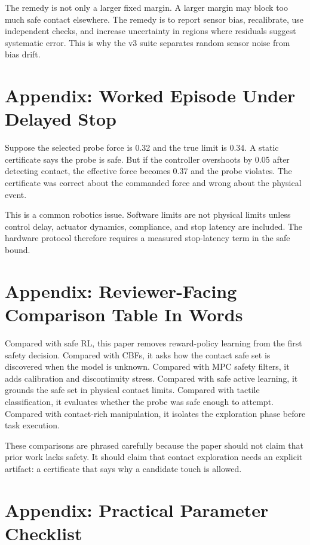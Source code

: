\documentclass{article}
\begin{document}
The remedy is not only a larger fixed margin. A larger margin may block too
much safe contact elsewhere. The remedy is to report sensor bias, recalibrate,
use independent checks, and increase uncertainty in regions where residuals
suggest systematic error. This is why the v3 suite separates random sensor
noise from bias drift.

\section{Appendix: Worked Episode Under Delayed Stop}

Suppose the selected probe force is 0.32 and the true limit is 0.34. A static
certificate says the probe is safe. But if the controller overshoots by 0.05
after detecting contact, the effective force becomes 0.37 and the probe
violates. The certificate was correct about the commanded force and wrong about
the physical event.

This is a common robotics issue. Software limits are not physical limits unless
control delay, actuator dynamics, compliance, and stop latency are included.
The hardware protocol therefore requires a measured stop-latency term in the
safe bound.

\section{Appendix: Reviewer-Facing Comparison Table In Words}

Compared with safe RL, this paper removes reward-policy learning from the
first safety decision. Compared with CBFs, it asks how the contact safe set is
discovered when the model is unknown. Compared with MPC safety filters, it adds
calibration and discontinuity stress. Compared with safe active learning, it
grounds the safe set in physical contact limits. Compared with tactile
classification, it evaluates whether the probe was safe enough to attempt.
Compared with contact-rich manipulation, it isolates the exploration phase
before task execution.

These comparisons are phrased carefully because the paper should not claim
that prior work lacks safety. It should claim that contact exploration needs an
explicit artifact: a certificate that says why a candidate touch is allowed.

\section{Appendix: Practical Parameter Checklist}
\end{document}
